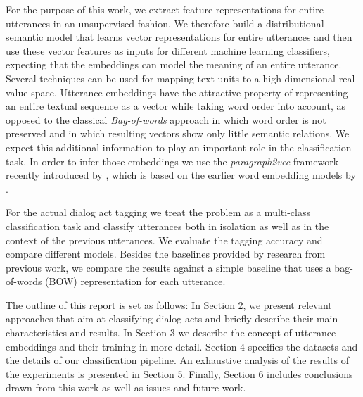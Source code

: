 For the purpose of this work, we extract feature representations for entire utterances in an unsupervised fashion.
We therefore build a distributional semantic model that learns vector representations for entire utterances and then use these vector features as inputs for different machine learning classifiers, expecting that the embeddings can model the meaning of an entire utterance.
Several techniques can be used for mapping text units to a high dimensional real value space.
Utterance embeddings have the attractive property of representing an entire textual sequence as a vector while taking word order into account, as opposed to the classical \emph{Bag-of-words} approach in which word order is not preserved and in which resulting vectors show only little semantic relations.
We expect this additional information to play an important role in the classification task. In order to infer those embeddings we use the \emph{paragraph2vec} framework recently introduced by , which is based on the earlier word embedding models by .

For the actual dialog act tagging we treat the problem as a multi-class classification task and classify utterances both in isolation as well as in the context of the previous utterances.
We evaluate the tagging accuracy and compare different models.
Besides the baselines provided by research from previous work, we compare the results against a simple baseline that uses a bag-of-words (BOW) representation for each utterance. 

The outline of this report is set as follows: In Section 2, we present relevant approaches that aim at classifying dialog acts and briefly describe their main characteristics and results. In Section 3 we describe the concept of utterance embeddings and their training in more detail. Section 4 specifies the datasets and the details of our classification pipeline. An exhaustive analysis of the results of the experiments is presented in Section 5. Finally, Section 6 includes conclusions drawn from this work as well as issues and future work. 
